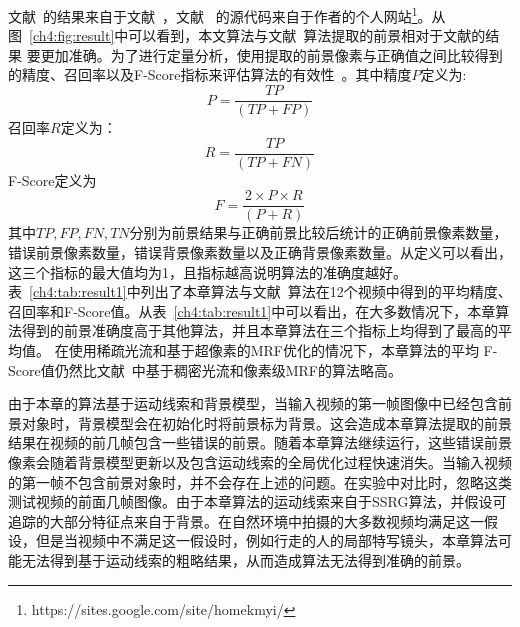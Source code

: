 文献~的结果来自于文献~，文献~ 的源代码来自于作者的个人网站\footnote{https://sites.google.com/site/homekmyi/}。从图~\ref{ch4:fig:result}中可以看到，本文算法与文献~算法提取的前景相对于文献\cite{kwak2011Generalized,5.8s}的结果 要更加准确。为了进行定量分析，使用提取的前景像素与正确值之间比较得到的精度、召回率以及F-Score指标来评估算法的有效性~\cite{CD2014}。其中精度$P$定义为:
$$ P = \frac{TP}{(TP+FP)}$$
召回率$R$定义为：
$$R = \frac{TP}{(TP+FN)}$$
F-Score定义为
$$F = \frac{2 \times P \times R}{(P + R)}$$
其中$TP,FP,FN,TN$分别为前景结果与正确前景比较后统计的正确前景像素数量，错误前景像素数量，错误背景像素数量以及正确背景像素数量。从定义可以看出，这三个指标的最大值均为1，且指标越高说明算法的准确度越好。表~\ref{ch4:tab:result1}中列出了本章算法与文献~算法在12个视频中得到的平均精度、召回率和F-Score值。从表~\ref{ch4:tab:result1}中可以看出，在大多数情况下，本章算法得到的前景准确度高于其他算法，并且本章算法在三个指标上均得到了最高的平均值。 在使用稀疏光流和基于超像素的MRF优化的情况下，本章算法的平均 F-Score值仍然比文献~中基于稠密光流和像素级MRF的算法略高。\par

由于本章的算法基于运动线索和背景模型，当输入视频的第一帧图像中已经包含前景对象时，背景模型会在初始化时将前景标为背景。这会造成本章算法提取的前景结果在视频的前几帧包含一些错误的前景。随着本章算法继续运行，这些错误前景像素会随着背景模型更新以及包含运动线索的全局优化过程快速消失。当输入视频的第一帧不包含前景对象时，并不会存在上述的问题。在实验中对比时，忽略这类测试视频的前面几帧图像。由于本章算法的运动线索来自于SSRG算法，并假设可追踪的大部分特征点来自于背景。在自然环境中拍摄的大多数视频均满足这一假设，但是当视频中不满足这一假设时，例如行走的人的局部特写镜头，本章算法可能无法得到基于运动线索的粗略结果，从而造成算法无法得到准确的前景。\par


